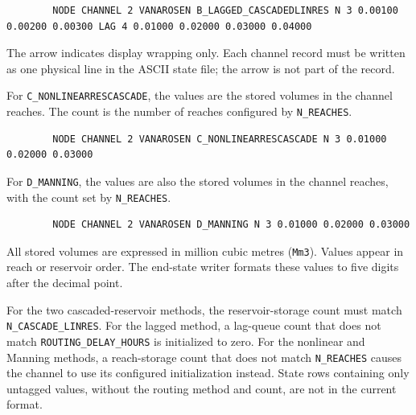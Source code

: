 \documentclass[a4paper, 12pt]{report}
\begin{document}
	\begin{lstlisting}
		NODE CHANNEL 2 VANAROSEN B_LAGGED_CASCADEDLINRES N 3 0.00100 0.00200 0.00300 LAG 4 0.01000 0.02000 0.03000 0.04000
	\end{lstlisting}

	The arrow indicates display wrapping only. Each channel record must be
	written as one physical line in the ASCII state file; the arrow is not
	part of the record.


	For \texttt{C\_NONLINEARRESCASCADE}, the values are the stored volumes in
	the channel reaches. The count is the number of reaches configured by
	\texttt{N\_REACHES}.


	\begin{lstlisting}
		NODE CHANNEL 2 VANAROSEN C_NONLINEARRESCASCADE N 3 0.01000 0.02000 0.03000
	\end{lstlisting}



	For \texttt{D\_MANNING}, the values are also the stored volumes in the
	channel reaches, with the count set by \texttt{N\_REACHES}.

	\begin{lstlisting}
		NODE CHANNEL 2 VANAROSEN D_MANNING N 3 0.01000 0.02000 0.03000
	\end{lstlisting}

	All stored volumes are expressed in million cubic metres (\texttt{Mm3}).
	Values appear in reach or reservoir order. The end-state writer formats
	these values to five digits after the decimal point.

	For the two cascaded-reservoir methods, the reservoir-storage count must
	match \texttt{N\_CASCADE\_LINRES}. For the lagged method, a lag-queue count
	that does not match \texttt{ROUTING\_DELAY\_HOURS} is initialized to zero.
	For the nonlinear and Manning methods, a reach-storage count that does not
	match \texttt{N\_REACHES} causes the channel to use its configured
	initialization instead. State rows containing only untagged values, without
	the routing method and count, are not in the current format.




    \newpage
\end{document}

